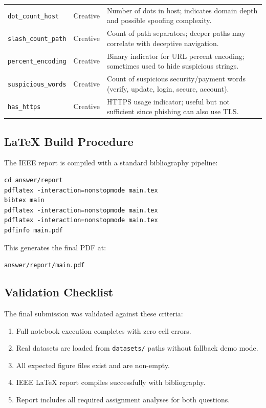\begin{table}[t]
\begin{tabular}{p{3.0cm}p{2.2cm}p{9.2cm}}
\texttt{dot\_count\_host} & Creative & Number of dots in host; indicates domain depth and possible spoofing complexity. \\
\texttt{slash\_count\_path} & Creative & Count of path separators; deeper paths may correlate with deceptive navigation. \\
\texttt{percent\_encoding} & Creative & Binary indicator for URL percent encoding; sometimes used to hide suspicious strings. \\
\texttt{suspicious\_words} & Creative & Count of suspicious security/payment words (verify, update, login, secure, account). \\
\texttt{has\_https} & Creative & HTTPS usage indicator; useful but not sufficient since phishing can also use TLS. \\
\bottomrule
\end{tabular}
\end{table}

\subsection{LaTeX Build Procedure}

The IEEE report is compiled with a standard bibliography pipeline:
\begin{lstlisting}[basicstyle=\ttfamily\footnotesize,frame=single]
cd answer/report
pdflatex -interaction=nonstopmode main.tex
bibtex main
pdflatex -interaction=nonstopmode main.tex
pdflatex -interaction=nonstopmode main.tex
pdfinfo main.pdf
\end{lstlisting}

This generates the final PDF at:
\begin{center}
\texttt{answer/report/main.pdf}
\end{center}

\subsection{Validation Checklist}

The final submission was validated against these criteria:
\begin{enumerate}
    \item Full notebook execution completes with zero cell errors.
    \item Real datasets are loaded from \texttt{datasets/} paths without fallback demo mode.
    \item All expected figure files exist and are non-empty.
    \item IEEE LaTeX report compiles successfully with bibliography.
    \item Report includes all required assignment analyses for both questions.
\end{enumerate}

